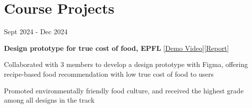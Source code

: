 \section{Course Projects}


        \begin{twocolentry}{
            Sept 2024 - Dec 2024
        }

        \textbf{Design prototype for true cost of food, EPFL }[\href{https://youtube.com/shorts/iSeM4460GBc?feature=share}{Demo Video}][\href{https://renyi.ch/reports/true-cost-of-food.pdf}{Report}]\end{twocolentry} 
        \vspace{0.10 cm}
        \begin{onecolentry}
            \begin{highlights}
                \item Collaborated with 3 members to develop a design prototype with Figma, offering recipe-based food recommendation with low true cost of food to users
                \item Promoted environmentally friendly food culture, and received the highest grade among all designs in the track
            \end{highlights}
        \end{onecolentry}


